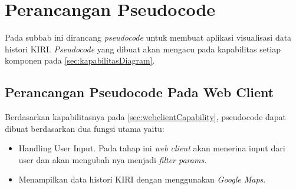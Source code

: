 \section{Perancangan Pseudocode}
\label{sec:psudeoCode}
Pada subbab ini dirancang \textit{pseudocode} untuk membuat aplikasi visualisasi data histori KIRI. \textit{Pseudocode} yang dibuat akan mengacu pada kapabilitas setiap komponen pada \ref{sec:kapabilitasDiagram}.

\subsection{Perancangan Pseudocode Pada Web Client}
\label{sec:psudeoCodeWebClient}
Berdasarkan kapabilitasnya  pada \ref{sec:webclientCapability}, pseudocode dapat dibuat berdasarkan dua fungsi utama yaitu:
\begin{itemize}
    \item Handling User Input. Pada tahap ini\textit{ web client} akan menerina input dari user dan akan mengubah nya menjadi \textit{filter params}.
    \item Menampilkan data histori KIRI dengan menggunakan \textit{Google Maps}.
\end{itemize} 

